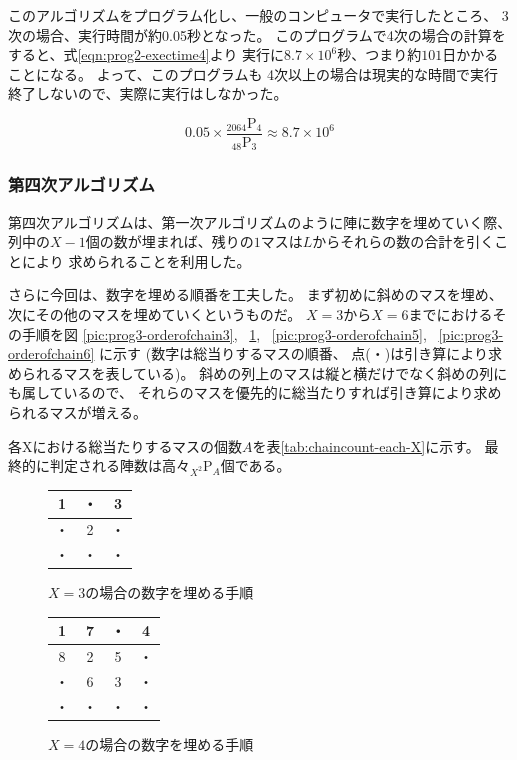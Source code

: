 このアルゴリズムをプログラム化し、一般のコンピュータで実行したところ、
3次の場合、実行時間が約0.05秒となった。
このプログラムで4次の場合の計算をすると、式\ref{eqn:prog2-exectime4}より
実行に$8.7 \times 10^6$秒、つまり約$101$日かかることになる。
よって、このプログラムも
4次以上の場合は現実的な時間で実行終了しないので、実際に実行はしなかった。

\begin{equation} \label{eqn:prog2-exectime4}
0.05 \times \frac{_{2064} \mathrm{P} _4}{_{48} \mathrm{P} _3} \approx 8.7 \times 10^6
\end{equation}

\subsubsection{第四次アルゴリズム}
第四次アルゴリズムは、第一次アルゴリズムのように陣に数字を埋めていく際、
列中の$X-1$個の数が埋まれば、残りの$1$マスは$L$からそれらの数の合計を引くことにより
求められることを利用した。

さらに今回は、数字を埋める順番を工夫した。
まず初めに斜めのマスを埋め、次にその他のマスを埋めていくというものだ。
$X=3$から$X=6$までにおけるその手順を図
\ref{pic:prog3-orderofchain3}, \ 
\ref{pic:prog3-orderofchain4}, \ 
\ref{pic:prog3-orderofchain5}, \ 
\ref{pic:prog3-orderofchain6}
に示す
(数字は総当りするマスの順番、
点(・)は引き算により求められるマスを表している)。
斜めの列上のマスは縦と横だけでなく斜めの列にも属しているので、
それらのマスを優先的に総当たりすれば引き算により求められるマスが増える。

各Xにおける総当たりするマスの個数$A$を表\ref{tab:chaincount-each-X}に示す。
最終的に判定される陣数は高々$_{X^2} \mathrm{P} _A$個である。


\begin{figure}
\begin{minipage}{0.5\hsize}
\begin{center}\begin{tabular}{|c|c|c|}\hline
1 & ・ & 3 \\\hline
・ & 2 & ・ \\\hline
・ & ・ & ・ \\\hline
\end{tabular}\end{center}
\caption{$X=3$の場合の数字を埋める手順}
\label{pic:prog3-orderofchain3}
\end{minipage}
\begin{minipage}{0.5\hsize}
\begin{center}\begin{tabular}{|c|c|c|c|}\hline
1&7& ・ &4 \\\hline
8&2&5& ・ \\\hline
・ &6&3& ・ \\\hline
・ & ・ & ・ & ・ \\\hline
\end{tabular}\end{center}
\caption{$X=4$の場合の数字を埋める手順}
\label{pic:prog3-orderofchain4}
\end{minipage}
\end{figure}


